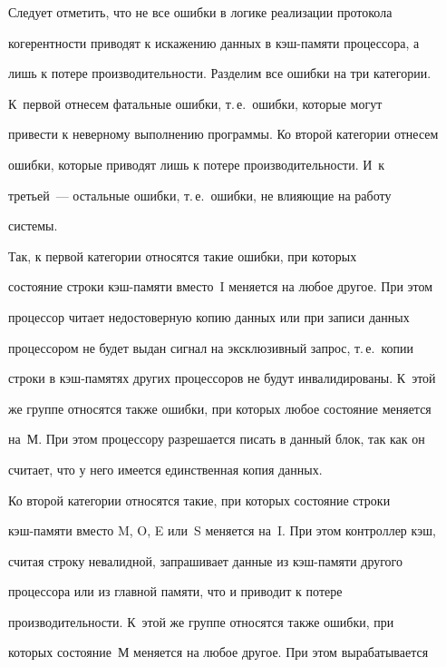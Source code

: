       


       Следует отметить, что не все ошибки в логике реализации протокола 


когерентности приводят к искажению данных в кэш-памяти процессора, а 


лишь к потере производительности. Разделим все ошибки на три категории. 


К~первой отнесем фатальные ошибки, т.\,е.\ ошибки, которые могут 


привести к неверному выполнению программы. Ко второй категории отнесем 


ошибки, которые приводят лишь к потере производительности. И~к 


третьей~--- остальные ошибки, т.\,е.\ ошибки, не влияющие на работу 


сис\-темы.


      


      Так, к первой категории относятся такие ошибки, при которых 


состояние строки кэш-памяти вместо~I меняется на любое другое. При этом 


процессор читает недостоверную копию данных или при записи данных 


процессором не будет выдан сигнал на эксклюзивный запрос, т.\,е.\ копии 


строки в кэш-па\-мя\-тях других процессоров не будут инвалидированы. К~этой 


же группе относятся также ошибки, при которых любое состояние меняется 


на~М. При этом процессору разрешается писать в данный блок, так как он 


считает, что у него имеется единственная копия данных.


      


      Ко второй категории относятся такие, при которых состояние строки 


кэш-па\-мя\-ти вместо M, O, E или~S меняется на~I. При этом контроллер кэш, 


считая строку невалидной, запрашивает данные из кэш-памяти другого 


процессора или из главной памяти, что и приводит к потере 


производительности. К~этой же группе относятся также ошибки, при 


которых состояние~М меняется на любое другое. При этом вырабатывается 


